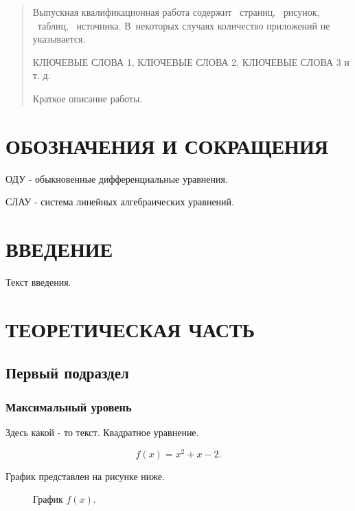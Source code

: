 \documentclass[rusmathsym, eqnumwithinsec,amspack, hyperref]{bomgost}
\begin{document}
\begin{abstract}
Выпускная квалификационная работа содержит \pageref{LastPage}~страниц, ~рисунок, ~таблиц, ~источника. В~некоторых случаях количество приложений не указывается.

КЛЮЧЕВЫЕ СЛОВА 1, КЛЮЧЕВЫЕ СЛОВА 2, КЛЮЧЕВЫЕ СЛОВА 3 и т. д.

Краткое описание работы.
\end{abstract}


\tableofcontents


\section*{ОБОЗНАЧЕНИЯ И СОКРАЩЕНИЯ}
ОДУ - обыкновенные дифференциальные уравнения.

СЛАУ - система линейных алгебраических уравнений.


\section*{ВВЕДЕНИЕ}
Текст введения.


\mainpart


\section{ТЕОРЕТИЧЕСКАЯ ЧАСТЬ}
\subsection{Первый подраздел}
\subsubsection{Максимальный уровень}
Здесь какой - то текст. Квадратное уравнение.

\begin{equation}
f(x) = x^2 + x-2.
\end{equation}

График представлен на рисунке ниже.
\begin{gostfigure}
\begin{figure}[H]
\centering
{}
\caption{График \(f(x)\).}
\end{figure}
\end{gostfigure}
\end{document}

